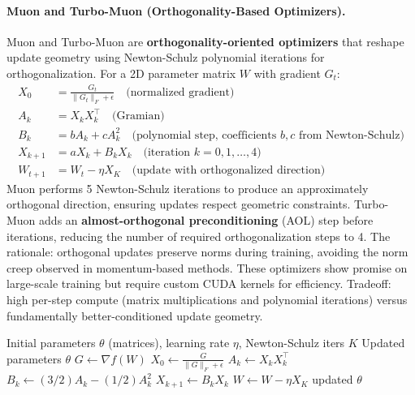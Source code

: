 \documentclass[11pt,a4paper]{article}
\begin{document}
\paragraph{Muon and Turbo-Muon (Orthogonality-Based Optimizers).}
Muon and Turbo-Muon are \textbf{orthogonality-oriented optimizers} that reshape update geometry using Newton-Schulz polynomial iterations for orthogonalization. For a 2D parameter matrix $W$ with gradient $G_t$:
\begin{align}
X_0 &= \frac{G_t}{\|G_t\|_F + \epsilon} \quad\text{(normalized gradient)} \\
A_k &= X_k X_k^\top \quad\text{(Gramian)} \\
B_k &= b A_k + c A_k^2 \quad\text{(polynomial step, coefficients $b, c$ from Newton-Schulz)} \\
X_{k+1} &= a X_k + B_k X_k \quad\text{(iteration $k=0,1,\ldots,4$)} \\
W_{t+1} &= W_t - \eta X_K \quad\text{(update with orthogonalized direction)}
\end{align}
Muon performs 5 Newton-Schulz iterations to produce an approximately orthogonal direction, ensuring updates respect geometric constraints. Turbo-Muon adds an \textbf{almost-orthogonal preconditioning} (AOL) step before iterations, reducing the number of required orthogonalization steps to 4. The rationale: orthogonal updates preserve norms during training, avoiding the norm creep observed in momentum-based methods. These optimizers show promise on large-scale training but require custom CUDA kernels for efficiency. Tradeoff: high per-step compute (matrix multiplications and polynomial iterations) versus fundamentally better-conditioned update geometry.

\begin{algorithm}[H]
\caption{Muon (Newton-Schulz Orthogonalization)}
\label{alg:muon}
\begin{algorithmic}[1]
\Require Initial parameters $\theta$ (matrices), learning rate $\eta$, Newton-Schulz iters $K$
\Ensure Updated parameters $\theta$
    \State $G \gets \nabla f(W)$ 
    \State $X_0 \gets \frac{G}{\|G\|_F + \epsilon}$ 
        \State $A_k \gets X_k X_k^\top$ 
        \State $B_k \gets (3/2) A_k - (1/2) A_k^2$ 
        \State $X_{k+1} \gets B_k X_k$ 
    \EndFor
    \State $W \gets W - \eta X_K$ 
\EndFor
\Return updated $\theta$
\end{algorithmic}
\end{algorithm}
\end{document}
